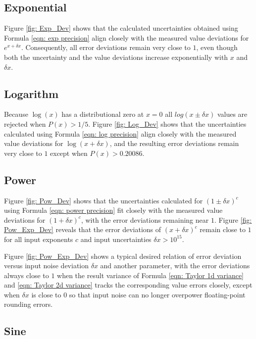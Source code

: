 \documentclass[twoside]{article}
\numberwithin{equation}{section}
\begin{document}
\subsection{Exponential}

Figure \ref{fig: Exp_Dev} shows that the calculated uncertainties obtained using Formula \eqref{eqn: exp precision} align closely with the measured value deviations for $e^{x + \delta x}$.
Consequently, all error deviations remain very close to $1$,  even though both the uncertainty and the value deviations increase exponentially with $x$ and $\delta x$.


\subsection{Logarithm}

Because $\log(x)$ has a distributional zero at $x=0$ all $log(x \pm \delta x)$ values are rejected when $P(x) > 1/5$.
Figure \ref{fig: Log_Dev} shows that the uncertainties calculated using Formula \eqref{eqn: log precision} align closely with the measured value deviations for $\log(x + \delta x)$, and the resulting error deviations remain very close to $1$ except when $P(x) > 0.20086$.


\subsection{Power}

Figure \ref{fig: Pow_Dev} shows that the uncertainties calculated for $(1 \pm \delta x)^c$ using Formula \eqref{eqn: power precision} fit closely with the measured value deviations for $(1 + \delta x)^c$, with the error deviations remaining near $1$.
Figure \ref{fig: Pow_Exp_Dev} reveals that the error deviations of $(x + \delta x)^c$ remain close to $1$ for all input exponents $c$ and input uncertainties $\delta x > 10^{15}$.

Figure \ref{fig: Pow_Exp_Dev} shows a typical desired relation of error deviation versus input noise deviation $\delta x$ and another parameter, with the error deviations always close to $1$ when the result variance of Formula \ref{eqn: Taylor 1d variance} and \ref{eqn: Taylor 2d variance} tracks the corresponding value errors closely, except when $\delta x$ is close to $0$ so that input noise can no longer overpower floating-point rounding errors.



\subsection{Sine}
\end{document}
